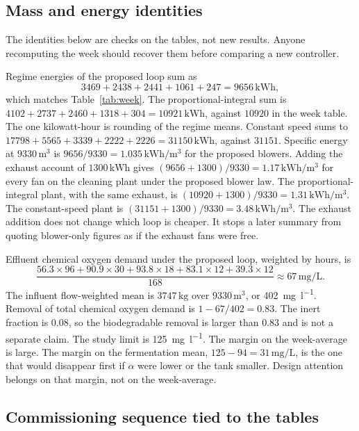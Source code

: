 \subsection{Mass and energy identities}

The identities below are checks on the tables, not new results. Anyone recomputing the week should recover them before comparing a new controller.

Regime energies of the proposed loop sum as
\begin{equation}
3469+2438+2441+1061+247
=
9656\,\mathrm{kWh},
\end{equation}
which matches Table~\ref{tab:week}. The proportional-integral sum is $4102+2737+2460+1318+304=10921\,\mathrm{kWh}$, against $10920$ in the week table. The one kilowatt-hour is rounding of the regime means. Constant speed sums to $17798+5565+3339+2222+2226=31150\,\mathrm{kWh}$, against $31151$. Specific energy at $9330\,\mathrm{m^{3}}$ is $9656/9330=1.035\,\mathrm{kWh/m^{3}}$ for the proposed blowers. Adding the exhaust account of $1300\,\mathrm{kWh}$ gives $(9656+1300)/9330=1.17\,\mathrm{kWh/m^{3}}$ for every fan on the cleaning plant under the proposed blower law. The proportional-integral plant, with the same exhaust, is $(10920+1300)/9330=1.31\,\mathrm{kWh/m^{3}}$. The constant-speed plant is $(31151+1300)/9330=3.48\,\mathrm{kWh/m^{3}}$. The exhaust addition does not change which loop is cheaper. It stops a later summary from quoting blower-only figures as if the exhaust fans were free.

Effluent chemical oxygen demand under the proposed loop, weighted by hours, is
\begin{equation}
\frac{
56.3\times 96
+
90.9\times 30
+
93.8\times 18
+
83.1\times 12
+
39.3\times 12
}{168}
\approx
67\,\mathrm{mg/L}.
\end{equation}
The influent flow-weighted mean is $3747\,\mathrm{kg}$ over $9330\,\mathrm{m^{3}}$, or \SI{402}{\milli\gram\per\litre}. Removal of total chemical oxygen demand is $1-67/402=0.83$. The inert fraction is $0.08$, so the biodegradable removal is larger than $0.83$ and is not a separate claim. The study limit is \SI{125}{\milli\gram\per\litre}. The margin on the week-average is large. The margin on the fermentation mean, $125-94=31\,\mathrm{mg/L}$, is the one that would disappear first if $\alpha$ were lower or the tank smaller. Design attention belongs on that margin, not on the week-average.

\subsection{Commissioning sequence tied to the tables}

